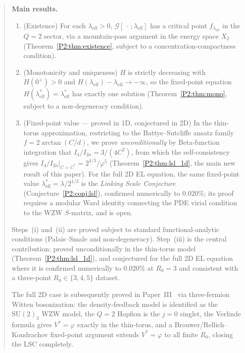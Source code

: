 \documentclass[11pt,a4paper]{article}
\newcommand{\vp}{\varphi}
\newcommand{\lam}{\lambda}
\newcommand{\leff}{\lambda_{\mathrm{eff}}}
\newcommand{\G}{\mathcal{G}}
\newcommand{\Ia}{I_{2a}}
\newcommand{\Ib}{I_{4}}
\theoremstyle{remark}
\begin{document}
\begin{abstract}
\textbf{Main results.}
\begin{enumerate}[noitemsep]
\item \textup{(Existence)} For each $\leff>0$, $\G[\,\cdot\,;\leff]$ has a critical
  point $f_{\leff}$ in the $Q=2$ sector, via a mountain-pass argument in
  the energy space $X_2$ (Theorem~\ref{P2:thm:existence}, subject to
  a concentration-compactness condition).
\item \textup{(Monotonicity and uniqueness)} $H$ is strictly decreasing
  with $H(0^+)>0$ and $H(\leff)-\leff\to-\infty$, so the fixed-point
  equation $H(\leff^*)=\leff^*$ has exactly one solution
  (Theorem~\ref{P2:thm:mono}, subject to a non-degeneracy condition).
\item \textup{(Fixed-point value --- proved in 1D, conjectured in 2D)}
  In the thin-torus approximation, restricting to the
  Battye--Sutcliffe ansatz family $f=2\arctan(C/d)$, we prove
  \emph{unconditionally} by Beta-function integration that
  $\Ib/\Ia = 3/(4C^2)$, from which the self-consistency gives
  $\Ib/\Ia\big|_{C=C^*} = 2^{4/3}/\vp^5$ (Theorem~\ref{P2:thm:lsl_1d},
  the main new result of this paper).
  For the full 2D EL equation, the same fixed-point value
  $\leff^*=\lam/2^{1/3}$ is the \emph{Linking Scale Conjecture}
  (Conjecture~\ref{P2:conj:lsl}), confirmed numerically to $0.020\%$;
  its proof requires a modular Ward identity connecting the PDE virial
  condition to the WZW $S$-matrix, and is open.
\end{enumerate}
Steps~(i) and~(ii) are proved subject to standard functional-analytic
conditions (Palais--Smale and non-degeneracy).
Step~(iii) is the central contribution: proved unconditionally in the
thin-torus model (Theorem~\ref{P2:thm:lsl_1d}), and conjectured for the
full 2D EL equation where it is confirmed numerically to $0.020\%$
at $R_0=3$ and consistent with a three-point $R_0\in\{3,4,5\}$ dataset.

The full 2D case is subsequently proved in Paper~III~\cite{Paper3}
via three-fermion Witten bosonization: the density-feedback model is
identified as the $\mathrm{SU}(2)_3$ WZW model, the $Q=2$ Hopfion is
the $j=0$ singlet, the Verlinde formula gives $V^*=\vp$ exactly in the
thin-torus, and a Brouwer/Rellich--Kondrachov fixed-point argument
extends $V^*=\vp$ to all finite $R_0$, closing the LSC completely.
\end{abstract}

\tableofcontents

\end{document}

